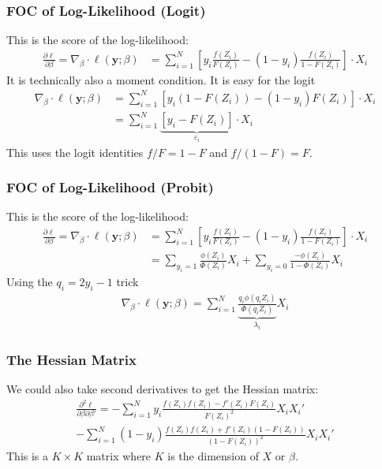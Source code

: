 \documentclass[aspectratio=169,11pt]{beamer}
\begin{document}
\begin{frame}
\frametitle{FOC of Log-Likelihood (Logit)}
This is the \alert{score} of the log-likelihood:
\begin{align*}
\frac{\partial \ell }{\partial \beta} = \nabla_{\beta} \cdot \ell(\symbf{y}; \beta) &=  \sum_{i=1}^N  \left[ y_i \frac{ f(Z_i) }{ F(Z_i)}  -  (1-y_i) \frac{f(Z_i) }{1-F(Z_i)} \right]  \cdot X_i 
\end{align*}
It is technically also a \alert{moment condition}. It is easy for the logit
\begin{align*}
 \nabla_{\beta} \cdot \ell(\symbf{y}; \beta) &=  \sum_{i=1}^N  \left[ y_i (1-F(Z_i)) -  (1-y_i) F(Z_i) \right] \cdot X_i \\
 &=  \sum_{i=1}^N  \underbrace{\left[ y_i - F(Z_i) \right]}_{\varepsilon_i} \cdot X_i 
\end{align*}
This uses the logit identities $f/F = 1-F$ and $f/(1-F) = F$.
\end{frame}

\begin{frame}
\frametitle{FOC of Log-Likelihood (Probit)}
This is the \alert{score} of the log-likelihood:
\begin{align*}
\frac{\partial \ell }{\partial \beta} = \nabla_{\beta} \cdot \ell(\symbf{y}; \beta) &=  \sum_{i=1}^N  \left[ y_i \frac{ f(Z_i) }{ F(Z_i)}  -  (1-y_i) \frac{f(Z_i) }{1-F(Z_i)} \right] \cdot X_i  \\
 &=  \sum_{y_i=1}  \frac{\phi(Z_i) }{ \Phi(Z_i)} X_i +\sum_{y_i=0} \frac{-\phi(Z_i) }{1-\Phi(Z_i)} X_i
\end{align*}
Using the $q_i = 2 y_i -1$ trick
\begin{align*}
\nabla_{\beta} \cdot \ell(\symbf{y}; \beta)= \sum_{i=1}^N \underbrace{\frac{ q_i \phi(q_i Z_i)}{\Phi(q_i Z_i)}}_{\lambda_i} X_i
\end{align*}
\end{frame}


\begin{frame}
\frametitle{The Hessian Matrix}
We could also take second derivatives to get the \alert{Hessian} matrix:
\begin{align*}
\frac{\partial^2 \ell }{\partial \beta \partial \beta'} = - \sum_{i=1}^N   y_i \frac{ f(Z_i)  f(Z_i) - f'(Z_i) F(Z_i) }{ F(Z_i)^2}  X_i X_i' \\
-  \sum_{i=1}^N   (1-y_i) \frac{f(Z_i)f(Z_i) + f'(Z_i)(1-F(Z_i))}{(1-F(Z_i))^2}  X_i X_i'
\end{align*}
This is a $K\times K$ matrix where $K$ is the dimension of $X$ or $\beta$.
\end{frame}
\end{document}
